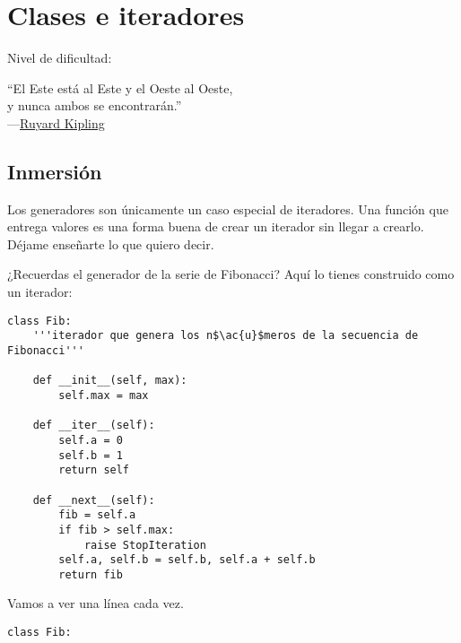
\chapter{Clases e iteradores}\label{ch:clases}

\noindent
Nivel de dificultad:\diflll

\begin{citaCap}
``El Este está al Este y el Oeste al Oeste, \\
y nunca ambos se encontrarán.''\\
---\href{http://en.wikiquote.org/wiki/Rudyard_Kipling}{Ruyard Kipling}
\end{citaCap}

\section{Inmersión}

Los generadores son únicamente un caso especial de iteradores. Una función que entrega valores es una forma buena de crear un iterador sin llegar a crearlo. Déjame enseñarte lo que quiero decir.

¿Recuerdas el generador de la serie de Fibonacci? Aquí lo tienes construido como un iterador:

\noindent\begin{minipage}{\textwidth}
\begin{lstlisting}[mathescape=True]
class Fib:
    '''iterador que genera los n$\ac{u}$meros de la secuencia de Fibonacci'''

    def __init__(self, max):
        self.max = max

    def __iter__(self):
        self.a = 0
        self.b = 1
        return self

    def __next__(self):
        fib = self.a
        if fib > self.max:
            raise StopIteration
        self.a, self.b = self.b, self.a + self.b
        return fib
\end{lstlisting}
\end{minipage}

Vamos a ver una línea cada vez.

\noindent\begin{minipage}{\textwidth}
\begin{lstlisting}[mathescape=True]
class Fib:
\end{lstlisting}
\end{minipage}

